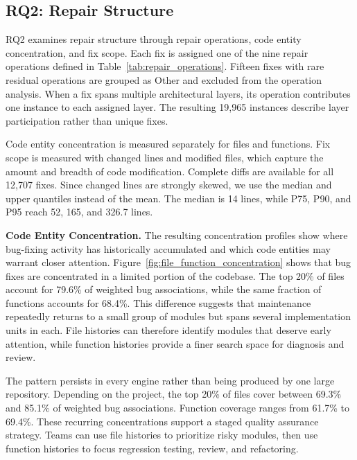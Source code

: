 \subsection{RQ2: Repair Structure}

RQ2 examines repair structure through repair operations, code entity concentration, and fix scope. Each fix is assigned one of the nine repair operations defined in Table~\ref{tab:repair_operations}. Fifteen fixes with rare residual operations are grouped as Other and excluded from the operation analysis. When a fix spans multiple architectural layers, its operation contributes one instance to each assigned layer. The resulting 19,965 instances describe layer participation rather than unique fixes.

Code entity concentration is measured separately for files and functions. Fix scope is measured with changed lines and modified files, which capture the amount and breadth of code modification. Complete diffs are available for all 12,707 fixes. Since changed lines are strongly skewed, we use the median and upper quantiles instead of the mean. The median is 14 lines, while P75, P90, and P95 reach 52, 165, and 326.7 lines.


\noindent\textbf{Code Entity Concentration.}
The resulting concentration profiles show where bug-fixing activity has historically accumulated and which code entities may warrant closer attention. Figure~\ref{fig:file_function_concentration} shows that bug fixes are concentrated in a limited portion of the codebase. The top 20\% of files account for 79.6\% of weighted bug associations, while the same fraction of functions accounts for 68.4\%. This difference suggests that maintenance repeatedly returns to a small group of modules but spans several implementation units in each. File histories can therefore identify modules that deserve early attention, while function histories provide a finer search space for diagnosis and review.

The pattern persists in every engine rather than being produced by one large repository. Depending on the project, the top 20\% of files cover between 69.3\% and 85.1\% of weighted bug associations. Function coverage ranges from 61.7\% to 69.4\%. These recurring concentrations support a staged quality assurance strategy. Teams can use file histories to prioritize risky modules, then use function histories to focus regression testing, review, and refactoring.



